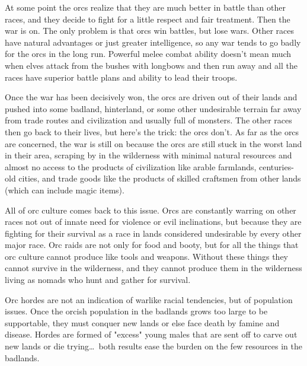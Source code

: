 At some point the orcs realize that they are much better in battle than other races, and they decide to fight for a little respect and fair treatment. Then the war is on. The only problem is that orcs win battles, but lose wars. Other races have natural advantages or just greater intelligence, so any war tends to go badly for the orcs in the long run. Powerful melee combat ability doesn't mean much when elves attack from the bushes with longbows and then run away and all the races have superior battle plans and ability to lead their troops.

Once the war has been decisively won, the orcs are driven out of their lands and pushed into some badland, hinterland, or some other undesirable terrain far away from trade routes and civilization and usually full of monsters. The other races then go back to their lives, but here's the trick: the orcs don't. As far as the orcs are concerned, the war is still on because the orcs are still stuck in the worst land in their area, scraping by in the wilderness with minimal natural resources and almost no access to the products of civilization like arable farmlands, centuries-old cities, and trade goods like the products of skilled craftsmen from other lands (which can include magic items).

All of orc culture comes back to this issue. Orcs are constantly warring on other races not out of innate need for violence or evil inclinations, but because they are fighting for their survival as a race in lands considered undesirable by every other major race. Orc raids are not only for food and booty, but for all the things that orc culture cannot produce like tools and weapons. Without these things they cannot survive in the wilderness, and they cannot produce them in the wilderness living as nomads who hunt and gather for survival.

Orc hordes are not an indication of warlike racial tendencies, but of population issues. Once the orcish population in the badlands grows too large to be supportable, they must conquer new lands or else face death by famine and disease. Hordes are formed of "excess" young males that are sent off to carve out new lands or die trying\ldots\  both results ease the burden on the few resources in the badlands.

